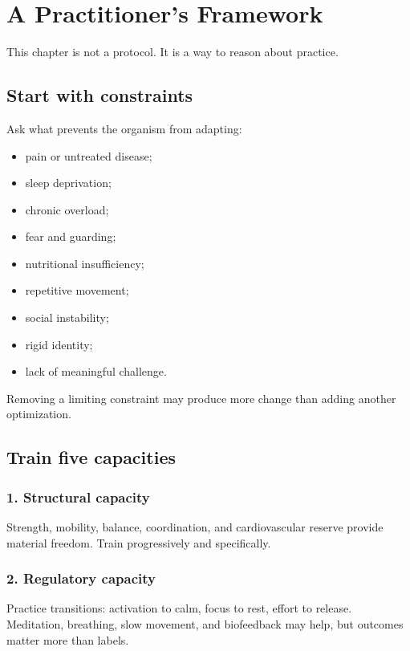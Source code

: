 \chapter{A Practitioner's Framework}

This chapter is not a protocol. It is a way to reason about practice.

\section{Start with constraints}

Ask what prevents the organism from adapting:

\begin{itemize}
\tightlist
\item
  pain or untreated disease;
\item
  sleep deprivation;
\item
  chronic overload;
\item
  fear and guarding;
\item
  nutritional insufficiency;
\item
  repetitive movement;
\item
  social instability;
\item
  rigid identity;
\item
  lack of meaningful challenge.
\end{itemize}

Removing a limiting constraint may produce more change than adding another optimization.

\section{Train five capacities}

\subsection{1. Structural capacity}

Strength, mobility, balance, coordination, and cardiovascular reserve provide material freedom. Train progressively and specifically.

\subsection{2. Regulatory capacity}

Practice transitions: activation to calm, focus to rest, effort to release. Meditation, breathing, slow movement, and biofeedback may help, but outcomes matter more than labels.

